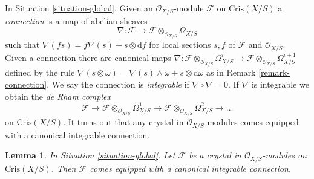 \documentclass{stacks-project}
\theoremstyle{plain}
\newtheorem{lemma}[subsection]{Lemma}
\theoremstyle{definition}
\theoremstyle{remark}
\numberwithin{equation}{subsection}
\begin{document}
\noindent
In Situation \ref{situation-global}.
Given an $\mathcal{O}_{X/S}$-module $\mathcal{F}$ on $\text{Cris}(X/S)$
a {\it connection} is a map of abelian sheaves
$$
\nabla :
\mathcal{F}
\longrightarrow
\mathcal{F} \otimes_{\mathcal{O}_{X/S}} \Omega_{X/S}
$$
such that $\nabla(f s) = f\nabla(s) + s \otimes \text{d}f$
for local sections $s, f$ of $\mathcal{F}$ and $\mathcal{O}_{X/S}$.
Given a connection there are canonical maps
$
\nabla :
\mathcal{F} \otimes_{\mathcal{O}_{X/S}} \Omega^i_{X/S}
\longrightarrow
\mathcal{F} \otimes_{\mathcal{O}_{X/S}} \Omega^{i + 1}_{X/S}
$
defined by the rule $\nabla(s \otimes \omega) =
\nabla(s) \wedge \omega + s \otimes \text{d}\omega$
as in Remark \ref{remark-connection}. We say the connection is
{\it integrable} if $\nabla \circ \nabla = 0$. If $\nabla$ is integrable
we obtain the {\it de Rham complex}
$$
\mathcal{F} \to
\mathcal{F} \otimes_{\mathcal{O}_{X/S}} \Omega^1_{X/S} \to
\mathcal{F} \otimes_{\mathcal{O}_{X/S}} \Omega^2_{X/S} \to \ldots
$$
on $\text{Cris}(X/S)$. It turns out that any crystal in
$\mathcal{O}_{X/S}$-modules comes equipped with a canonical
integrable connection.

\begin{lemma}
\label{lemma-automatic-connection}
In Situation \ref{situation-global}.
Let $\mathcal{F}$ be a crystal in $\mathcal{O}_{X/S}$-modules
on $\text{Cris}(X/S)$. Then $\mathcal{F}$ comes equipped with a
canonical integrable connection.
\end{lemma}
\end{document}
